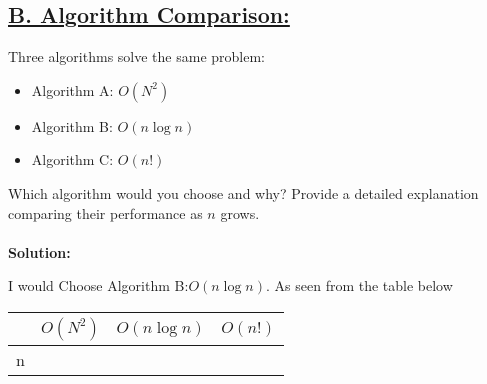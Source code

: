 \documentclass{article}
\begin{document}
\subsection*{\underline{B. Algorithm Comparison:}}
Three algorithms solve the same problem:
\begin{itemize}
    \item Algorithm A: \(O(N^2)\)
    \item Algorithm B: \(O(n\log n)\)
    \item Algorithm C: \(O(n!)\)
\end{itemize}
Which algorithm would you choose and why? Provide a detailed explanation comparing their performance as \(n\) grows.\\ \\
\textbf{Solution:}
\begin{myindentpar}{.5cm}
    I would Choose Algorithm B:\(O(n\log n)\). As seen from the table below
\end{myindentpar}
\begin{center}
    \begin{tabular}{|c|c|c|c|}
    \hline
    &\(O(N^2)\)&\(O(n\log n)\) &\(O(n!)\) \\ [0,5ex]
    \hline\hline
    n & 
    
    \end{tabular}
\end{center}
\end{document}
